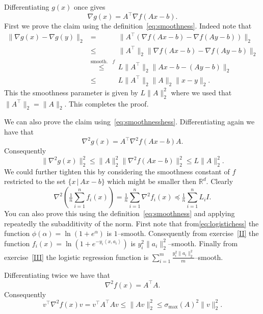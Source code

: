 \documentclass[11pt]{article}
\newcommand{\R}{\mathbb{R}}
\newcommand{\norm}[1]{\lVert#1\rVert}
\newcommand{\dotprod}[1]{\left< #1\right>}
\begin{document}
\begin{ExerciseList}
   \Answer[ref={II}]    Differentiating $g(x)$ once gives
   \[\nabla g(x) = A^\top \nabla f(Ax-b).\]
First we prove the claim using the definition~\eqref{eq:smoothness}. Indeed note that
\begin{eqnarray*}
\norm{\nabla g(x) - \nabla g(y)}_2 & = &
\norm{A^\top \left(\nabla f(Ax-b) - \nabla f(Ay-b)\right)}_2 \\
& \leq & \norm{A^\top}_2 \norm{\nabla f(Ax-b) - \nabla f(Ay-b)}_2 \\
& \overset{\mbox{smooth. of $f$}}{\leq} &L\norm{A^\top}_2 \norm{Ax-b -(Ay -b)}_2 \\
& \leq & L\norm{A^\top}_2\norm{A}_2  \norm{x-y}_2.
\end{eqnarray*}   
   This the smoothness parameter is given by $L\norm{A}_2^2$ where we used that $\norm{A^\top}_2 = \norm{A}_2.$ This completes the proof.
   
   
  We can also prove the claim using~\eqref{eq:smoothnesshess}. Differentiating again we have that
   \[\nabla^2 g(x) = A^\top  \nabla^2 f(Ax-b)A.\]  
   Consequently
   \[\norm{ \nabla^2 g(x)}_2^2\leq \norm{A}_2^2 \norm{\nabla^2 f(Ax-b)}_2^2 \leq L\norm{A}_2^2. \]   
    We could further tighten this by considering the smoothness constant of $f$ restricted to the set $\{x \, | \, Ax-b\}$ which might be smaller then $\R^d.$
 \Answer[ref={III}] Clearly
    \[ \nabla^2 (\tfrac{1}{n} \sum_{i=1}^n f_i(x)) =
    \tfrac{1}{n} \sum_{i=1}^n \nabla^2f_i(x) \preceq \tfrac{1}{n} \sum_{i=1}^n L_i I.  \]
    You can also prove this using the definition~\eqref{eq:smoothness} and applying repeatedly the subadditivity of the norm.
 \Answer[ref={IV}] First note that from\eqref{eq:logistichess} the function  $\phi(\alpha) = \ln(1+e^{\alpha})$ is $1$--smooth. Consequently from exercise~\ref{II} the function $f_i(x) = \ln(1+e^{-y_i\dotprod{x,a_i}})$ is $y_i^2\norm{a_i}_2^2$--smooth. Finally from exercise~\ref{III} the logistic regression function is $\sum_{i=1}^m \frac{y_i^2\norm{a_i}_2^2}{m}$--smooth.
 
% 
% 
  \Answer[ref={V}]     Differentiating twice we have that 
     \[\nabla^2 f(x) = A^\top A.\]
     Consequently 
     \[v^\top \nabla^2 f(x)v = v^\top A^\top A v \leq \norm{Av}_2^2 \leq \sigma_{\max}(A)^2 \norm{v}_2^2.\]
\end{ExerciseList}
\printbibliography
\end{document}
